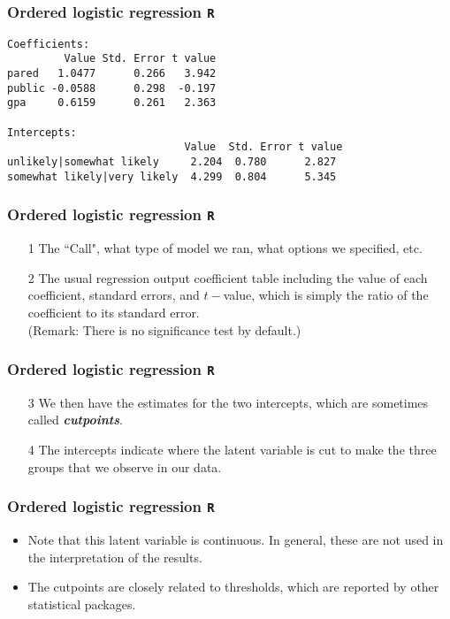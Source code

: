 \documentclass[00-GLMregslides.tex]{subfiles}
\begin{document}
\begin{frame}[fragile]
	\frametitle{Ordered logistic regression \texttt{R} }
	\normalsize
\begin{verbatim}
Coefficients:
         Value Std. Error t value
pared   1.0477      0.266   3.942
public -0.0588      0.298  -0.197
gpa     0.6159      0.261   2.363

Intercepts:
                            Value  Std. Error t value
unlikely|somewhat likely     2.204  0.780      2.827 
somewhat likely|very likely  4.299  0.804      5.345 

\end{verbatim}

\end{frame}
\begin{frame}[fragile]
	\frametitle{Ordered logistic regression \texttt{R} }
	\Large
\begin{itemize}
\item[1] The ``Call", what type of model we ran, what options we specified, etc.
\item[2] The usual regression output coefficient table including the value of each coefficient, standard errors, and 
$t-$value, which is simply the ratio of the coefficient to its standard error.\\ (Remark: There is no significance test by default.)
\end{itemize}
\end{frame}
\begin{frame}[fragile]
	\frametitle{Ordered logistic regression \texttt{R} }
	\Large
\begin{itemize}
\item[3]	
We then have the estimates for the two intercepts, which are sometimes called \textbf{\textit{cutpoints}}. 
\item[4] The intercepts indicate where the latent variable is cut to make the three groups that we observe in our data. 
\end{itemize}
\end{frame}
\begin{frame}[fragile]
	\frametitle{Ordered logistic regression \texttt{R} }
	\Large
\begin{itemize}
\item Note that this latent variable is continuous. In general, these are not used in the interpretation of the results. \item  The cutpoints are closely related to thresholds, which are reported by other statistical packages.
\end{itemize}
\end{frame}
\end{document}
